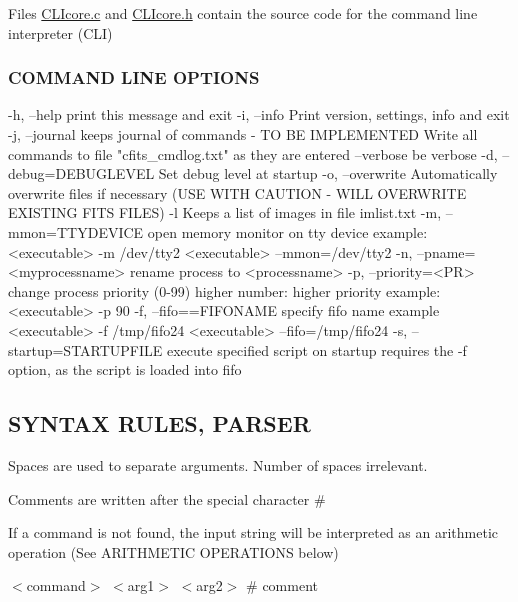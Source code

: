 Files \hyperlink{CLIcore_8c}{C\+L\+Icore.\+c} and \hyperlink{CLIcore_8h}{C\+L\+Icore.\+h} contain the source code for the command line interpreter (C\+L\+I)

\subsubsection*{C\+O\+M\+M\+A\+N\+D L\+I\+N\+E O\+P\+T\+I\+O\+N\+S}

\begin{DoxyVerb}  -h, --help 
    print this message and exit
  -i, --info
    Print version, settings, info and exit
  -j, --journal
    keeps journal of commands - TO BE IMPLEMENTED 
    Write all commands to file "cfits_cmdlog.txt" as they are entered
  --verbose
    be verbose
  -d, --debug=DEBUGLEVEL
    Set debug level at startup
  -o, --overwrite 
    Automatically overwrite files if necessary (USE WITH CAUTION - WILL OVERWRITE EXISTING FITS FILES)
  -l
    Keeps a list of images in file imlist.txt
  -m, --mmon=TTYDEVICE
    open memory monitor on tty device
    example:
    <executable> -m /dev/tty2
    <executable> --mmon=/dev/tty2
  -n, --pname=<myprocessname>
    rename process to <processname>
  -p, --priority=<PR>
    change process priority (0-99)
    higher number: higher priority
    example:
    <executable> -p 90
  -f, --fifo==FIFONAME
        specify fifo name
        example
        <executable> -f /tmp/fifo24
        <executable> --fifo=/tmp/fifo24
  -s, --startup=STARTUPFILE
        execute specified script on startup
        requires the -f option, as the script is loaded into fifo
\end{DoxyVerb}


\subsection*{S\+Y\+N\+T\+A\+X R\+U\+L\+E\+S, P\+A\+R\+S\+E\+R}


\begin{DoxyItemize}
\item Spaces are used to separate arguments. Number of spaces irrelevant.
\item Comments are written after the special character \#
\item If a command is not found, the input string will be interpreted as an arithmetic operation (See A\+R\+I\+T\+H\+M\+E\+T\+I\+C O\+P\+E\+R\+A\+T\+I\+O\+N\+S below)
\end{DoxyItemize}

$<$command$>$ $<$arg1$>$ $<$arg2$>$ \# comment

